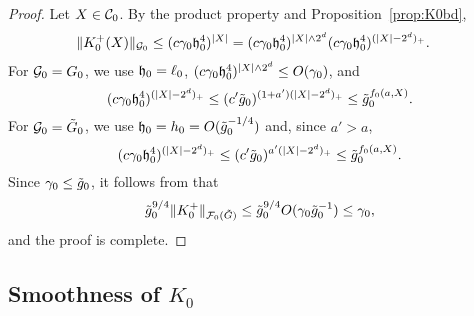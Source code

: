 \begin{proof}
Let $X \in \mathcal{C}_0$.
By the product property and Proposition~\ref{prop:K0bd},
\begin{align}
\lbeq{K0prod}
    \|K_0^\pm(X)\|_{\Gcal_0} \le (c\gamma_0\h_0^4)^{|X|}
    &=
    (c\gamma_0\h_0^4)^{|X|\wedge 2^d} (c\gamma_0\h_0^4)^{(|X|-2^d)_+}.
\end{align}
For $\mathcal{G}_0=G_0$, we use $\mathfrak{h}_0=\ell_0$,
$(c\gamma_0\mathfrak{h}_0^4)^{|X|\wedge 2^d}\le O(\gamma_0)$, and
\begin{equation}
    (c\gamma_0\mathfrak{h}_0^4)^{(|X|-2^d)_+} \le (c' \tilde{g}_0)^{(1+a')(|X|-2^d)_+} \le \tilde{g}_0^{f_0(a,X)}.
\end{equation}
For $\mathcal{G}_0=\tilde G_0$, we use $\mathfrak{h}_0=h_0 = O(\tilde{g}_0^{-1/4})$ and, since $a'>a$,
\begin{equation}
    (c\gamma_0\mathfrak{h}_0^4)^{(|X|-2^d)_+} \le (c' \tilde{g}_0)^{a'(|X|-2^d)_+} \le \tilde{g}_0^{f_0(a,X)}.
\end{equation}
Since $\gamma_0 \le \tilde{g}_0$, it follows from  that
\begin{equation}
    \tilde{g}_0^{9/4}   \|K_0^+ \|_{\mathcal{F}_0(\tilde{G})}
    \le
    \tilde{g}_0^{9/4}O(\gamma_0 \tilde{g}_0^{-1})
    \le \gamma_0,
\end{equation}
and the proof is complete.
\end{proof}



\subsection{Smoothness of \texorpdfstring{$K_0$}{K0}}
\label{sec:Ksmooth}


